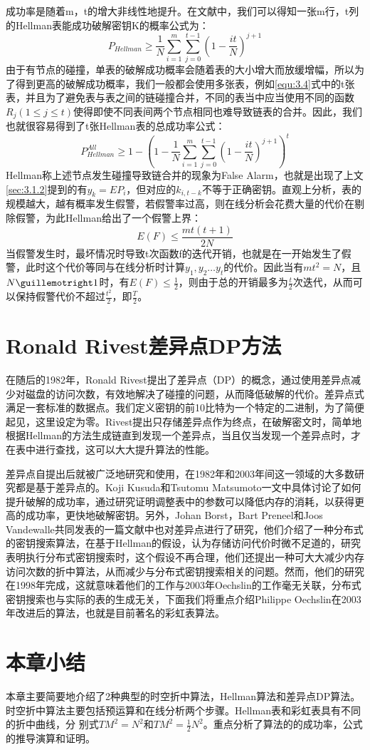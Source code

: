 成功率是随着m，t的增大非线性地提升。在文献\cite{hellman}中，我们可以得知一张m行，t列的Hellman表能成功破解密钥K的概率公式为：
\begin{equation}
P_{Hellman}\geq \frac{1}{N}\sum_{i=1}^{m}\sum_{j=0}^{t-1}\left(1-\frac{it}{N}\right)^{j+1}
\label{equ:3.7}
\end{equation}
由于有节点的碰撞，单表的破解成功概率会随着表的大小增大而放缓增幅，所以为了得到更高的破解成功概率，我们一般都会使用多张表，例如\eqref{equ:3.4}式中的t张表，并且为了避免表与表之间的链碰撞合并，不同的表当中应当使用不同的函数$R_j(1\leq j \leq t)$使得即使不同表间两个节点相同也难导致链表的合并。因此，我们也就很容易得到了t张Hellman表的总成功率公式：
\begin{equation}
\boxed{P_{Hellman}^{All}\geq 1-\left(1-\frac{1}{N}\sum_{i=1}^{m}\sum_{j=0}^{t-1}\left(1-\frac{it}{N}\right)^{j+1}\right)^t}
\end{equation}
Hellman称上述节点发生碰撞导致链合并的现象为False Alarm，也就是出现了上文\ref{sec:3.1.2}提到的有$y_k=EP_i$，但对应的$k_{i,t-k}$不等于正确密钥。直观上分析，表的规模越大，越有概率发生假警，若假警率过高，则在线分析会花费大量的代价在剔除假警，为此Hellman给出了一个假警上界：
\begin{equation}
E(F)\leq \frac{mt(t+1)}{2N}
\end{equation}
当假警发生时，最坏情况时导致t次函数f的迭代开销，也就是在一开始发生了假警，此时这个代价等同与在线分析时计算$y_1,y_2\ldots y_t$的代价。因此当有$mt^2=N$，且$N\guillemotright 1$时，有$E(F)\leq \frac{1}{2}$，则由于总的开销最多为$\frac{t}{2}$次迭代，从而可以保持假警代价不超过$\frac{t^2}{2}$，即$\frac{T}{2}$。
\section{Ronald Rivest差异点DP方法}
\label{sec:3.2}
在随后的1982年，Ronald Rivest提出了差异点（DP）的概念，通过使用差异点减少对磁盘的访问次数，有效地解决了碰撞的问题，从而降低破解的代价。差异点式满足一套标准的数据点。我们定义密钥的前10比特为一个特定的二进制，为了简便起见，这里设定为零。Rivest提出只存储差异点作为终点，在破解密文时，简单地根据Hellman的方法生成链直到发现一个差异点，当且仅当发现一个差异点时，才在表中进行查找，这可以大大提升算法的性能。

差异点自提出后就被广泛地研究和使用，在1982年和2003年间这一领域的大多数研究都是基于差异点的。Koji Kusuda和Tsutomu Matsumoto\cite{koji}一文中具体讨论了如何提升破解的成功率，通过研究证明调整表中的参数可以降低内存的消耗，以获得更高的成功率，更快地破解密钥。另外，Johan Borst，Bart Preneel和Joos Vandewalle\cite{jbj}共同发表的一篇文献中也对差异点进行了研究，他们介绍了一种分布式的密钥搜索算法，在基于Hellman的假设，认为存储访问代价时微不足道的，研究表明执行分布式密钥搜索时，这个假设不再合理，他们还提出一种可大大减少内存访问次数的折中算法，从而减少与分布式密钥搜索相关的问题。然而，他们的研究在1998年完成，这就意味着他们的工作与2003年Oechslin的工作毫无关联，分布式密钥搜索也与实际的表的生成无关，下面我们将重点介绍Philippe Oechslin在2003年改进后的算法，也就是目前著名的彩虹表算法。
\section{本章小结}
本章主要简要地介绍了2种典型的时空折中算法，Hellman算法和差异点DP算法。时空折中算法主要包括预运算和在线分析两个步骤。Hellman表和彩虹表具有不同的折中曲线，分
别式$TM^2=N^2$和$TM^2=\frac{1}{2}N^2$。重点分析了算法的的成功率，公式的推导演算和证明。
